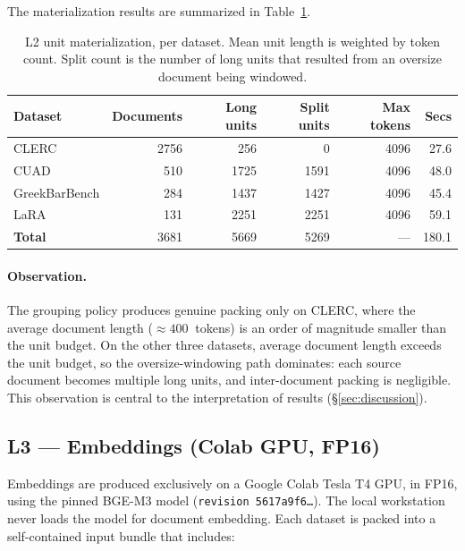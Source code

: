 \documentclass[11pt,a4paper]{article}
\begin{document}
The materialization results are summarized in
Table~\ref{tab:l2}.

\begin{table}[h]
\centering
\caption{L2 unit materialization, per dataset. Mean unit length is
weighted by token count. Split count is the number of long units that
resulted from an oversize document being windowed.}
\label{tab:l2}
\small
\begin{tabular}{l r r r r r}
\toprule
\textbf{Dataset} & \textbf{Documents} & \textbf{Long units}
  & \textbf{Split units} & \textbf{Max tokens} & \textbf{Secs} \\
\midrule
CLERC              & \num{2756} & \num{256}   & \num{0}     & \num{4096} & \num{27.6} \\
CUAD               & \num{510}  & \num{1725}  & \num{1591}  & \num{4096} & \num{48.0} \\
GreekBarBench      & \num{284}  & \num{1437}  & \num{1427}  & \num{4096} & \num{45.4} \\
LaRA               & \num{131}  & \num{2251}  & \num{2251}  & \num{4096} & \num{59.1} \\
\midrule
\textbf{Total}     & \num{3681} & \num{5669}  & \num{5269}  & ---        & \num{180.1} \\
\bottomrule
\end{tabular}
\end{table}

\paragraph{Observation.}
The grouping policy produces genuine packing only on CLERC, where the
average document length ($\approx \SI{400}{}$ tokens) is an order
of magnitude smaller than the unit budget. On the other three
datasets, average document length exceeds the unit budget, so the
oversize-windowing path dominates: each source document becomes
multiple long units, and inter-document packing is negligible. This
observation is central to the interpretation of results
(\S\ref{sec:discussion}).

\subsection{L3 --- Embeddings (Colab GPU, FP16)}
\label{sec:l3}

Embeddings are produced exclusively on a Google Colab Tesla T4 GPU,
in FP16, using the pinned BGE-M3 model
(\texttt{revision 5617a9f6\dots}). The local workstation never loads
the model for document embedding. Each dataset is packed into a
self-contained input bundle that includes:
\end{document}
